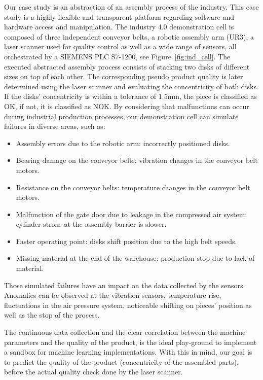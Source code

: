 \documentclass[5p,times,procedia]{elsarticle}
\begin{document}
Our case study is an abstraction of an assembly process of the industry. This case study is a highly flexible and transparent platform regarding software and hardware access and manipulation. The industry 4.0 demonstration cell is composed of three independent conveyor belts, a robotic assembly arm (UR3), a laser scanner used for quality control as well as a wide range of sensors, all orchestrated by a SIEMENS PLC S7-1200, see Figure~\ref{fig:ind_cell}. 
The executed abstracted assembly process consists of stacking two disks of different sizes on top of each other. The corresponding pseudo product quality is later determined using the laser scanner and evaluating the concentricity of both disks. If the disks' concentricity is within a tolerance of 1.5mm, the piece is classified as OK, if not, it is classified as NOK.
By considering that malfunctions can occur during industrial production processes, our demonstration cell can simulate failures in diverse areas, such as:

\begin{itemize}
       \item Assembly errors due to the robotic arm: incorrectly positioned disks.
       \item Bearing damage on the conveyor belts: vibration changes in the conveyor belt motors.
       \item Resistance on the conveyor belts: temperature changes in the conveyor belt motors.
       \item Malfunction of the gate door due to leakage in the compressed air system: cylinder stroke at the assembly barrier is slower.
       \item Faster operating point: disks shift position due to the high belt speeds.
       \item Missing material at the end of the warehouse: production stop due to lack of material.
\end{itemize}

Those simulated failures have an impact on the data collected by the sensors. Anomalies can be observed at the vibration sensors, temperature rise, fluctuations in the air pressure system, noticeable shifting on pieces' position as well as the stop of the process.

The continuous data collection and the clear correlation between the machine parameters and the quality of the product, is the ideal play-ground to implement a sandbox for machine learning implementations. With this in mind, our goal is to predict the quality of the product (concentricity of the assembled parts), before the actual quality check done by the laser scanner. 
\end{document}

